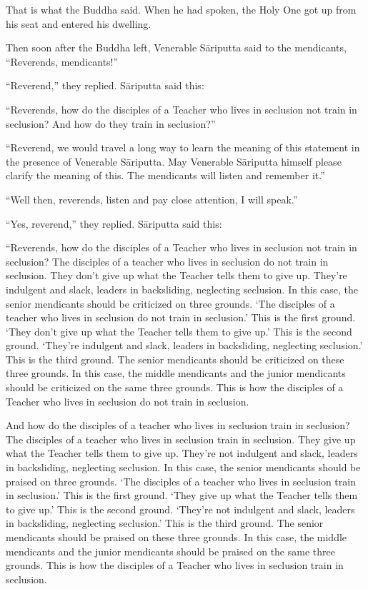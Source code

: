 \documentclass[12pt,openany]{book}%
\begin{document}
That is what the Buddha said. When he had spoken, the Holy One got up from his seat and entered his dwelling. 

Then soon after the Buddha left, Venerable \textsanskrit{Sāriputta} said to the mendicants, “Reverends, mendicants!” 

“Reverend,” they replied. \textsanskrit{Sāriputta} said this: 

“Reverends, how do the disciples of a Teacher who lives in seclusion not train in seclusion? And how do they train in seclusion?” 

“Reverend, we would travel a long way to learn the meaning of this statement in the presence of Venerable \textsanskrit{Sāriputta}. May Venerable \textsanskrit{Sāriputta} himself please clarify the meaning of this. The mendicants will listen and remember it.” 

“Well then, reverends, listen and pay close attention, I will speak.” 

“Yes, reverend,” they replied. \textsanskrit{Sāriputta} said this: 

“Reverends, how do the disciples of a Teacher who lives in seclusion not train in seclusion? The disciples of a teacher who lives in seclusion do not train in seclusion. They don’t give up what the Teacher tells them to give up. They’re indulgent and slack, leaders in backsliding, neglecting seclusion. In this case, the senior mendicants should be criticized on three grounds. ‘The disciples of a teacher who lives in seclusion do not train in seclusion.’ This is the first ground. ‘They don’t give up what the Teacher tells them to give up.’ This is the second ground. ‘They’re indulgent and slack, leaders in backsliding, neglecting seclusion.’ This is the third ground. The senior mendicants should be criticized on these three grounds. In this case, the middle mendicants and the junior mendicants should be criticized on the same three grounds. This is how the disciples of a Teacher who lives in seclusion do not train in seclusion. 

And how do the disciples of a teacher who lives in seclusion train in seclusion? The disciples of a teacher who lives in seclusion train in seclusion. They give up what the Teacher tells them to give up. They’re not indulgent and slack, leaders in backsliding, neglecting seclusion. In this case, the senior mendicants should be praised on three grounds. ‘The disciples of a teacher who lives in seclusion train in seclusion.’ This is the first ground. ‘They give up what the Teacher tells them to give up.’ This is the second ground. ‘They’re not indulgent and slack, leaders in backsliding, neglecting seclusion.’ This is the third ground. The senior mendicants should be praised on these three grounds. In this case, the middle mendicants and the junior mendicants should be praised on the same three grounds. This is how the disciples of a Teacher who lives in seclusion train in seclusion. 
\end{document}
